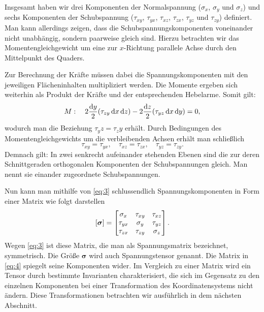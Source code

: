\documentclass{lecture}
\begin{document}
    Insgesamt haben wir drei Komponenten der Normalspannung (\(\sigma_x\), \(\sigma_y\) und \(\sigma_z\)) und sechs Komponenten der Schubspannung (\(\tau_{xy}\), \(\tau_{yx}\), \(\tau_{xz}\), \(\tau_{zx}\), \(\tau_{yz}\) und \(\tau_{zy}\)) definiert.
    Man kann allerdings zeigen, dass die Schubspannungskomponenten voneinander nicht unabhängig, sondern paarweise gleich sind.
    Hierzu betrachten wir das Momentengleichgewicht um eine zur \(x\)-Richtung parallele Achse durch den Mittelpunkt des Quaders.


    Zur Berechnung der Kräfte müssen dabei die Spannungskomponenten mit den jeweiligen Flächeninhalten multipliziert werden.
    Die Momente ergeben sich weiterhin als Produkt der Kräfte und der entsprechenden Hebelarme.
    Somit gilt:
    \[
        M:\quad 2\frac{\d y}{2}\parentheses*{\tau_{zy}\d x\d z} - 2\frac{\d z}{2}\parentheses*{\tau_{yz}\d x\d y} = 0,
    \]
    wodurch man die Beziehung \(\tau_yz = \tau_zy\) erhält.
    Durch Bedingungen des Momentengleichgewichts um die verbleibenden Achsen erhält man schließlich
    \begin{equation}\label{eq:3}
        \tau_{xy} = \tau_{yx}, \quad \tau_{xz} = \tau_{zx}, \quad \tau_{yz} = \tau_{zy}.
    \end{equation}
    Demnach gilt: In zwei senkrecht aufeinander stehenden Ebenen sind die zur deren Schnittgeraden orthogonalen Komponenten der Schubspannungen gleich.
    Man nennt sie einander zugeordnete Schubspannungen.

    Nun kann man mithilfe von \eqref{eq:3} schlussendlich Spannungskomponenten in Form einer Matrix wie folgt darstellen
    \begin{equation}\label{eq:4}
        \brackets*{\bm{\sigma}} = \begin{bmatrix}
            \sigma_x & \tau_{xy} & \tau_{xz}\\
            \tau_{yx} & \sigma_y & \tau_{yz}\\
            \tau_{zx} & \tau_{zy} & \sigma_z
        \end{bmatrix}.
    \end{equation}
    Wegen \eqref{eq:3} ist diese Matrix, die man als Spannungsmatrix bezeichnet, symmetrisch.
    Die Größe \(\bm{\sigma}\) wird auch Spannungstensor genannt.
    Die Matrix in \eqref{eq:4} spiegelt seine Komponenten wider.
    Im Vergleich zu einer Matrix wird ein Tensor durch bestimmte Invarianten charakterisiert, die sich im Gegensatz zu den einzelnen Komponenten bei einer Transformation des Koordinatensystems nicht ändern.
    Diese Transformationen betrachten wir ausführlich in dem nächsten Abschnitt.
\end{document}
